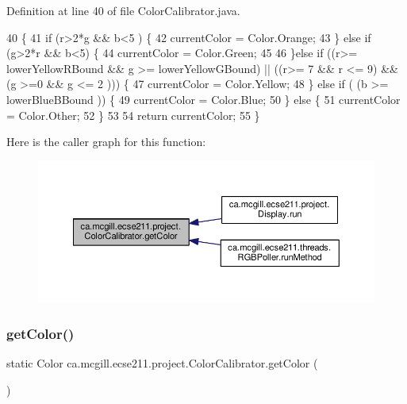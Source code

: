 Definition at line 40 of file Color\+Calibrator.\+java.


\begin{DoxyCode}
40                                                     \{
41     \textcolor{keywordflow}{if} (r>2*g && b<5 ) \{
42       currentColor = Color.Orange;
43     \} \textcolor{keywordflow}{else} \textcolor{keywordflow}{if} (g>2*r && b<5) \{
44       currentColor = Color.Green;
45       
46       \}\textcolor{keywordflow}{else} \textcolor{keywordflow}{if} ((r>= lowerYellowRBound && g >= lowerYellowGBound) || ((r>= 7 && r <= 9) && (g >=0 && g <= 2
      ))) \{
47       currentColor = Color.Yellow;
48     \} \textcolor{keywordflow}{else} \textcolor{keywordflow}{if} ( (b >= lowerBlueBBound )) \{
49       currentColor = Color.Blue;
50     \} \textcolor{keywordflow}{else} \{
51       currentColor = Color.Other;
52     \}
53 
54     \textcolor{keywordflow}{return} currentColor;
55   \}
\end{DoxyCode}
Here is the caller graph for this function\+:
\nopagebreak
\begin{figure}[H]
\begin{center}
\leavevmode
\includegraphics[width=350pt]{classca_1_1mcgill_1_1ecse211_1_1project_1_1_color_calibrator_a92e653a6a9f7a31cb7b6f9bc2e732133_icgraph}
\end{center}
\end{figure}
\mbox{\label{classca_1_1mcgill_1_1ecse211_1_1project_1_1_color_calibrator_a1acf05f9523b2c0f329d4a7cbf1b9c47}} 
\subsubsection{\texorpdfstring{get\+Color()}{getColor()}\hspace{0.1cm}{\footnotesize\ttfamily [2/2]}}
{\footnotesize\ttfamily static Color ca.\+mcgill.\+ecse211.\+project.\+Color\+Calibrator.\+get\+Color (\begin{DoxyParamCaption}{ }\end{DoxyParamCaption})\hspace{0.3cm}{\ttfamily [static]}}

